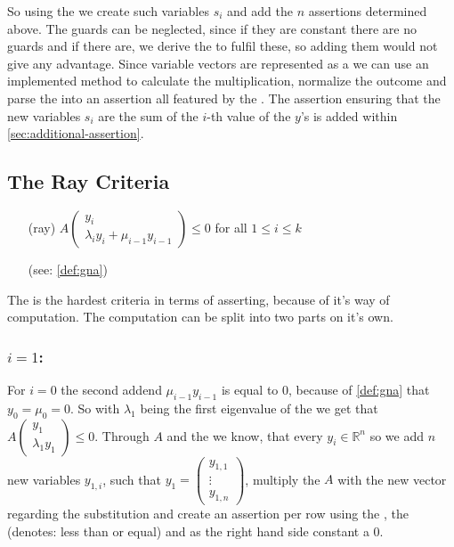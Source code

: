 So using the \smtfactory we create such variables $s_i$ and add the $n$ assertions determined above. The guards can be neglected, since if they are constant there are no guards and if there are, we derive the \stem to fulfil these, so adding them would not give any advantage.\newline
Since variable vectors are represented as a \rpntree we can use an implemented method to calculate the multiplication, normalize the outcome and parse the \rpntree into an assertion all featured by the \smtfactory. \newline
The assertion ensuring that the new variables $s_i$ are the sum of the $i$-th value of the $y$'s is added within \autoref{sec:additional-assertion}.


\subsection{The Ray Criteria}
\label{sec:ray-criteria}
\begin{itemize}
	\setlength{\itemindent}{1in}
	\item[(ray)] $A\begin{pmatrix} y_i \\ \lambda_i y_i + \mu_{i-1} y_{i-1} \end{pmatrix} \le 0$ for all $1 \le i \le k$
	\item[] (see: \autoref{def:gna})
\end{itemize}
The \rayc is the hardest criteria in terms of asserting, because of it's way of computation. \newline
The computation can be split into two parts on it's own.
\subsubsection{$i=1$:}
For $i=0$ the second addend $\mu_{i-1}y_{i-1}$ is equal to $0$, because of \autoref{def:gna} that $y_0 = \mu_0 = 0$. So with $\lambda_1$ being the first eigenvalue of the \updatematrix we get that $A\begin{pmatrix} y_1 \\ \lambda_1 y_1 \end{pmatrix} \le 0$. \newline
Through $A$ and the \domc we know, that every $y_i\in \mathbb{R}^n$ so we add $n$ new variables $y_{1,i}$, such that $y_1 = \begin{pmatrix} y_{1,1} \\ \vdots \\ y_{1,n}\end{pmatrix}$, multiply the \updatematrix $A$ with the new vector regarding the substitution and create an assertion per row using the \smtfactory, the   (denotes: less than or equal) and as the right hand side constant a 0.

